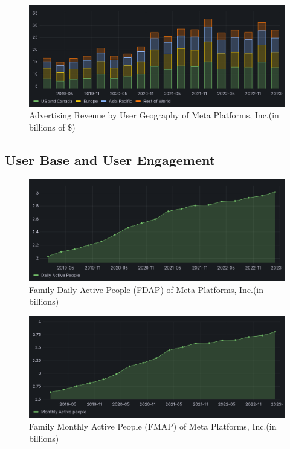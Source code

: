 \documentclass[12pt, a4paper]{article}
\begin{document}
\begin{figure}[H]
    \centering
    \includegraphics[width=1.00\textwidth]{advertising-revenue-by-user-geography}
    \caption{Advertising Revenue by User Geography of Meta Platforms, Inc.(in
    billions of \$)\cite{2023q1,2021q2Slides,2019q4Slides}}
    \label{fig:advertising-revenue-by-user-geography}
\end{figure}

\subsection*{User Base and User Engagement}

\begin{figure}[H]
    \centering
    \includegraphics[width=1.00\textwidth]{family-dap}
    \caption{Family Daily Active People (FDAP) of Meta Platforms, Inc.(in
    billions)\cite{2023q1,2021q2Slides,2019q4Slides}}
    \label{fig:family-dap}
\end{figure}

\begin{figure}[H]
    \centering
    \includegraphics[width=1.00\textwidth]{family-map}
    \caption{Family Monthly Active People (FMAP) of Meta Platforms, Inc.(in
    billions)\cite{2023q1,2021q2Slides,2019q4Slides}}
    \label{fig:family-map}
\end{figure}
\end{document}
